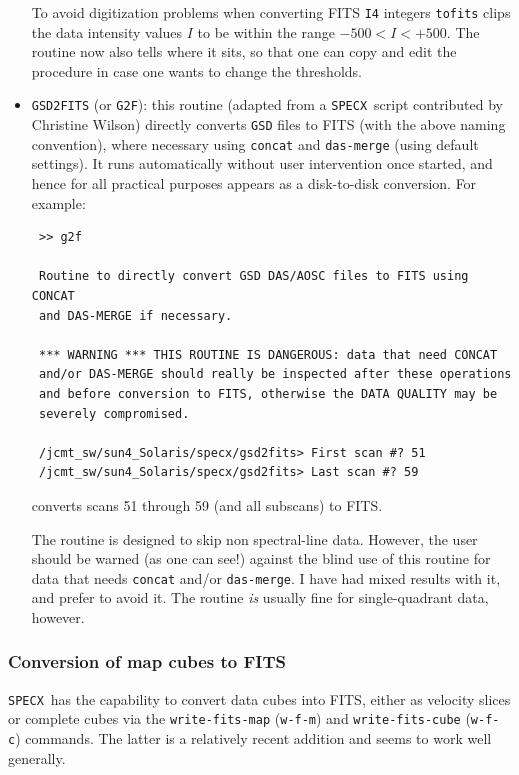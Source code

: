 \documentclass[11pt,twoside]{article}
\newcommand{\SPECX}{{\tt SPECX}}
\begin{document}
\begin{itemize}
To avoid digitization problems when converting FITS {\tt I4} integers
{\tt tofits} clips the data intensity values $I$ to be within the
range $-500 < I < +500$. The routine now also tells where it sits, so
that one can copy and edit the procedure in case one wants to change
the thresholds.

\item
{\tt GSD2FITS} (or {\tt G2F}): this routine (adapted from a \SPECX\
script contributed by Christine Wilson) directly converts {\tt GSD}
files to FITS (with the above naming convention), where necessary
using {\tt concat} and {\tt das-merge} (using default settings). It
runs automatically without user intervention once started, and hence
for all practical purposes appears as a disk-to-disk conversion.  For
example:

\begin{verbatim}
 >> g2f

 Routine to directly convert GSD DAS/AOSC files to FITS using CONCAT
 and DAS-MERGE if necessary.

 *** WARNING *** THIS ROUTINE IS DANGEROUS: data that need CONCAT
 and/or DAS-MERGE should really be inspected after these operations
 and before conversion to FITS, otherwise the DATA QUALITY may be
 severely compromised.

 /jcmt_sw/sun4_Solaris/specx/gsd2fits> First scan #? 51
 /jcmt_sw/sun4_Solaris/specx/gsd2fits> Last scan #? 59

\end{verbatim}

converts scans 51 through 59 (and all subscans) to FITS.

The routine is designed to skip non spectral-line data. However, the
user should be warned (as one can see!) against the blind use of this
routine for data that needs {\tt concat} and/or {\tt das-merge}. I
have had mixed results with it, and prefer to avoid it. The
routine {\it is} usually fine for single-quadrant data, however.
\end{itemize}

\subsubsection{Conversion of map cubes to FITS}
\label{sec:specxmaps2fits}
\SPECX\ has the capability to convert data cubes into FITS, either as
velocity slices or complete cubes via the {\tt write-fits-map}
({\tt{w-f-m}}) and {\tt write-fits-cube} ({\tt{w-f-c}}) commands. The
latter is a relatively recent addition and seems to work well
generally.
\end{document}

